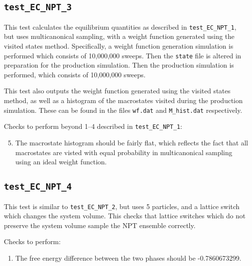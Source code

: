 \documentclass{report}
\begin{document}
\subsection{\texttt{test\_EC\_NPT\_3}}
This test calculates the equilibrium quantities as described in \texttt{test\_EC\_NPT\_1}, but uses multicanonical sampling,
with a weight function generated using the visited states method. Specifically, a weight function generation 
simulation is performed which consists of 10,000,000 sweeps. Then the \texttt{state} file is altered in preparation 
for the production simulation. Then the production simulation is performed, which consists of 10,000,000 sweeps.

This test also outputs the weight function generated using the visited states method, as well as a histogram of 
the macrostates visited during the production simulation. These can be found in the files \texttt{wf.dat} and \texttt{M\_hist.dat}
respectively. 

Checks to perform beyond  1--4 described in \texttt{test\_EC\_NPT\_1}:
\begin{enumerate}
\setcounter{enumi}{4}
\item
The macrostate histogram should be fairly flat, which reflects the fact that all macrostates are
visted with equal probability in multicanonical sampling using an ideal weight function.
\end{enumerate}


\subsection{\texttt{test\_EC\_NPT\_4}}
This test is similar to \texttt{test\_EC\_NPT\_2}, but uses 5 particles, and a lattice switch which changes the system volume.
This checks that lattice switches which do not preserve the system volume sample the NPT ensemble correctly.

Checks to perform:
\begin{enumerate}
\item
The free energy difference between the two phases should be -0.7860673299.
\end{enumerate}






\end{document}
